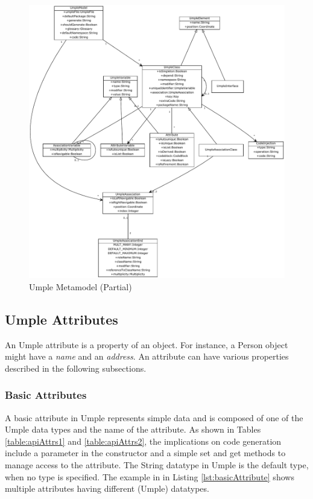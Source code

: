 \begin{figure}[H]
\includegraphics[width=1\textwidth]{Figures/metamodelUmple.pdf} 
\caption{Umple Metamodel (Partial)}
\label{fig:umpleMetamodel}
\end{figure}

\subsection{Umple Attributes}
\label{subsection:attributes}
An Umple attribute is a property of an object. For instance, 
a Person object might have a \textit{name} and an \textit{address}. 
An attribute can have various properties described in the following subsections.

\subsubsection{Basic Attributes}
A basic attribute in Umple represents simple data and is composed of one of the Umple data types and the name of the attribute. As shown in Tables \ref{table:apiAttrs1} and \ref{table:apiAttrs2}, the implications on code generation include a parameter in the constructor and a simple set and get methods to manage access to the attribute. The String datatype in Umple is the default type, when no type is specified. The example in in Listing \ref{lst:basicAttribute} shows multiple attributes having different (Umple) datatypes.

